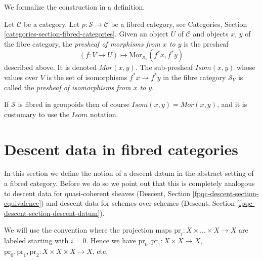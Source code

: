 \noindent
We formalize the construction in a definition.

\begin{definition}
\label{definition-mor-presheaf}
Let $\mathcal{C}$ be a category.
Let $p : \mathcal{S} \to \mathcal{C}$ be a fibred category,
see Categories, Section \ref{categories-section-fibred-categories}.
Given an object $U$ of $\mathcal{C}$ and objects
$x$, $y$ of the fibre category, the {\it presheaf
of morphisms from $x$ to $y$} is the presheaf
$$
(f : V \to U) \longmapsto \text{Mor}_{\mathcal{S}_V}(f^*x, f^*y)
$$
described above. It is denoted $\mathit{Mor}(x, y)$.
The sub-presheaf $\mathit{Isom}(x, y)$ whose values
over $V$ is the set of isomorphisms
$f^*x \to f^*y$ in the fibre category $\mathcal{S}_V$
is called the {\it presheaf of isomorphisms from $x$ to $y$}.
\end{definition}

\noindent
If $\mathcal{S}$ is fibred in groupoids then of course
$\mathit{Isom}(x, y) = \mathit{Mor}(x, y)$, and it is
customary to use the $\mathit{Isom}$ notation.




\section{Descent data in fibred categories}
\label{section-descent-data}

\noindent
In this section we define the notion of a descent datum
in the abstract setting of a fibred category. Before we
do so we point out that this is completely analogous to
descent data for quasi-coherent sheaves
(Descent, Section \ref{fpqc-descent-section-equivalence})
and descent data for schemes over schemes
(Descent, Section \ref{fpqc-descent-section-descent-datum}).

\medskip\noindent
We will use the convention where the projection maps
$\text{pr}_i : X \times \ldots \times X \to X$
are labeled starting with $i = 0$. Hence we have
$\text{pr}_0, \text{pr}_1 : X \times X  \to X$,
$\text{pr}_0, \text{pr}_1, \text{pr}_2 : X \times X \times X  \to X$,
etc.

